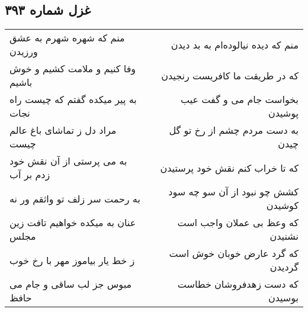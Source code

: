 \begin{center}
\section*{غزل شماره ۳۹۳}
\label{sec:sh393}
\begin{longtable}{l p{0.5cm} r}
منم که شهره شهرم به عشق ورزیدن
&&
منم که دیده نیالوده‌ام به بد دیدن
\\
وفا کنیم و ملامت کشیم و خوش باشیم
&&
که در طریقت ما کافریست رنجیدن
\\
به پیر میکده گفتم که چیست راه نجات
&&
بخواست جام می و گفت عیب پوشیدن
\\
مراد دل ز تماشای باغ عالم چیست
&&
به دست مردم چشم از رخ تو گل چیدن
\\
به می پرستی از آن نقش خود زدم بر آب
&&
که تا خراب کنم نقش خود پرستیدن
\\
به رحمت سر زلف تو واثقم ور نه
&&
کشش چو نبود از آن سو چه سود کوشیدن
\\
عنان به میکده خواهیم تافت زین مجلس
&&
که وعظ بی عملان واجب است نشنیدن
\\
ز خط یار بیاموز مهر با رخ خوب
&&
که گرد عارض خوبان خوش است گردیدن
\\
مبوس جز لب ساقی و جام می حافظ
&&
که دست زهدفروشان خطاست بوسیدن
\\
\end{longtable}
\end{center}

